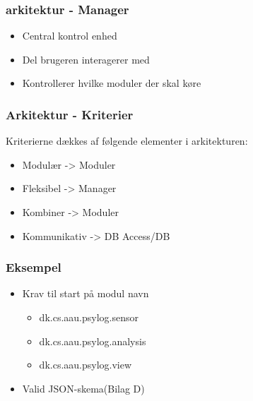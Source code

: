 \begin{frame}
\frametitle{arkitektur - Manager}
\begin{itemize}
\item Central kontrol enhed
\item Del brugeren interagerer med
\item Kontrollerer hvilke moduler der skal køre 
\end{itemize}
\end{frame}

\begin{frame}
\frametitle{Arkitektur - Kriterier}
Kriterierne dækkes af følgende elementer i arkitekturen:
\begin{itemize}
\item Modulær -> Moduler
\item Fleksibel -> Manager
\item Kombiner -> Moduler
\item Kommunikativ -> DB Access/DB
\end{itemize}
\end{frame}

\begin{frame}
\frametitle{Eksempel}
\begin{itemize}
\item Krav til start på modul navn
\begin{itemize}
\item dk.cs.aau.psylog.sensor
\item dk.cs.aau.psylog.analysis
\item dk.cs.aau.psylog.view
\end{itemize}
\item Valid JSON-skema(Bilag D)
\end{itemize}
\end{frame}

